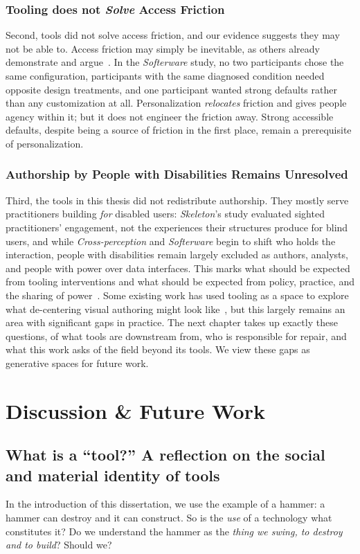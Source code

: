 \documentclass[12pt]{cmuthesis}
\begin{document}
\subsection{Tooling does not \textit{Solve} Access Friction}
Second, tools did not solve access friction, and our evidence suggests they may not be able to. Access friction may simply be inevitable, as others already demonstrate and argue~\cite{Mingus2011AccessIntimacy,Hamraie2017Designing,Hsueh}. In the \textit{Softerware} study, no two participants chose the same configuration, participants with the same diagnosed condition needed opposite design treatments, and one participant wanted strong defaults rather than any customization at all. Personalization \textit{relocates} friction and gives people agency within it; but it does not engineer the friction away. Strong accessible defaults, despite being a source of friction in the first place, remain a prerequisite of personalization.

\subsection{Authorship by People with Disabilities Remains Unresolved}
Third, the tools in this thesis did not redistribute authorship. They mostly serve practitioners building \textit{for} disabled users: \textit{Skeleton}'s study evaluated sighted practitioners' engagement, not the experiences their structures produce for blind users, and while \textit{Cross-perception} and \textit{Softerware} begin to shift who holds the interaction, people with disabilities remain largely excluded as authors, analysts, and people with power over data interfaces. This marks what should be expected from tooling interventions and what should be expected from policy, practice, and the sharing of power~\cite{Spiel2020}. Some existing work has used tooling as a space to explore what de-centering visual authoring might look like~\cite{Zong2024}, but this largely remains an area with significant gaps in practice. The next chapter takes up exactly these questions, of what tools are downstream from, who is responsible for repair, and what this work asks of the field beyond its tools. We view these gaps as generative spaces for future work.

\chapter{Discussion \& Future Work}

\section{What is a ``tool?'' A reflection on the social and material identity of tools}
In the introduction of this dissertation, we use the example of a hammer: a hammer can destroy and it can construct. So is the \textit{use} of a technology what constitutes it? Do we understand the hammer as the \textit{thing we swing, to destroy and to build}? Should we?
\end{document}

